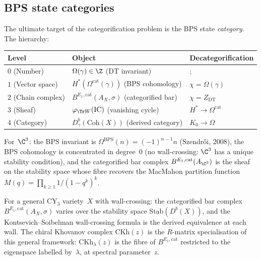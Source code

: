 \subsection{BPS state categories}
\label{subsec:bps-categories}

The ultimate target of the categorification problem is the BPS state \emph{category}. The hierarchy:
\begin{center}
\renewcommand{\arraystretch}{1.2}
\begin{tabular}{lll}
\toprule
\textbf{Level} & \textbf{Object} & \textbf{Decategorification} \\
\midrule
$0$ (Number) & $\Omega(\gamma) \in \Z$ (DT invariant) &; \\
$1$ (Vector space) & $H^*(\Omega^{\mathrm{cat}}(\gamma))$ (BPS cohomology) & $\chi = \Omega(\gamma)$ \\
$2$ (Chain complex) & $B^{E_1,\mathrm{cat}}(A_X, \sigma)$ (categorified bar) & $\chi = Z_{\mathrm{DT}}$ \\
$3$ (Sheaf) & $\varphi_{\Tr W}(\mathrm{IC})$ (vanishing cycle) & $H^* \to \Omega^{\mathrm{cat}}$ \\
$4$ (Category) & $D^b_\gamma(\mathrm{Coh}(X))$ (derived category) & $K_0 \to \Omega$ \\
\bottomrule
\end{tabular}
\end{center}

For~$\C^3$: the BPS invariant is $\Omega^{\mathrm{BPS}}(n) = (-1)^{n-1} n$ (Szendr\H{o}i, 2008), the BPS cohomology is concentrated in degree~$0$ (no wall-crossing: $\C^3$ has a unique stability condition), and the categorified bar complex $B^{E_1,\mathrm{cat}}(A_{\C^3})$ is the sheaf on the stability space whose fibre recovers the MacMahon partition function $M(q) = \prod_{k \geq 1} 1/(1-q^k)^k$.

For a general CY$_3$ variety~$X$ with wall-crossing: the categorified bar complex $B^{E_1,\mathrm{cat}}(A_X, \sigma)$ varies over the stability space $\mathrm{Stab}(D^b(X))$, and the Kontsevich--Soibelman wall-crossing formula is the derived equivalence at each wall. The chiral Khovanov complex $\mathrm{CKh}(z)$ is the $R$-matrix specialisation of this general framework: $\mathrm{CKh}_\lambda(z)$ is the fibre of $B^{E_1,\mathrm{cat}}$ restricted to the eigenspace labelled by~$\lambda$, at spectral parameter~$z$.

